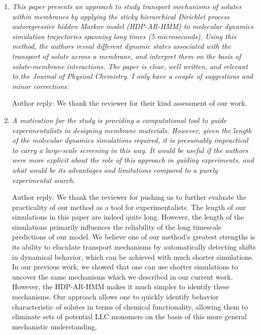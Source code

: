 \documentclass{article}
\begin{document}
\begin{enumerate}[label={Comment \theenumi :}, leftmargin=3.9\parindent]  

    \item \textit{This paper presents an approach to study transport mechanisms of solutes within
    membranes by applying the sticky hierarchical Dirichlet process autoregressive hidden Markov model
    (HDP-AR-HMM) to molecular dynamics simulation trajectories spanning long times (5 microseconds). 
    Using this method, the authors reveal different dynamic states associated with the transport of 
    solute across a membrane, and interpret them on the basis of solute-membrane interactions. The 
    paper is clear, well written, and relevant to the Journal of Physical Chemistry. I only have a 
    couple of suggestions and minor corrections:}
    
    Author reply: We thank the reviewer for their kind assessment of our work.

    \item \textit{A motivation for the study is providing a computational tool to guide experimentalists
    in designing membrane materials. However, given the length of the molecular dynamics simulations 
    required, it is presumably impractical to carry a large-scale screening in this way. It would be 
    useful if the authors were more explicit about the role of this approach in guiding experiments, 
    and what would be its advantages and limitations compared to a purely experimental search.}
    
    Author reply: We thank the reviewer for pushing us to further evaluate the practicality of our
    method as a tool for experimentalists. The length of our simulations in this paper are indeed 
    quite long. 
    However, the length of the simulations primarily influences the reliability of the long
    timescale predictions of our model. We believe one of our method's greatest strengths is its 
    ability to elucidate transport mechanisms by automatically detecting shifts in dynamical
    behavior, which can be achieved with much shorter simulations. 
    In our previous work, we showed that one can use shorter simulations to uncover the same 
    mechanisms which we described in our current work.~\cite{coscia_chemically_2019} However, the
    HDP-AR-HMM makes it much simpler to identify these mechanisms. Our approach allows one to 
    quickly identify behavior characteristic of solutes in terms of chemical functionality, 
    allowing them to eliminate sets of potential LLC monomers on the basis of this more general
    mechanistic understanding. 
    

\end{enumerate}
\end{document}

